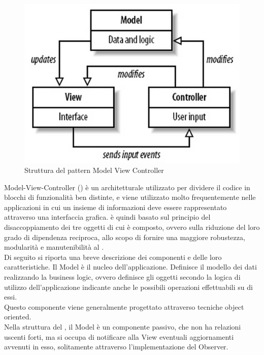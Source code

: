  \label{app:designpattern}
	 \label{app:MVC}
		\begin{figure}[H]\centering
        \includegraphics[scale=0.7]{SpecificaTecnica/Pics/MVC}
        \caption{Struttura del pattern Model View Controller}
		\end{figure}
		Model-View-Controller () è un  architetturale utilizzato per dividere il codice in blocchi di funzionalità ben distinte, e viene utilizzato molto frequentemente nelle applicazioni in cui un insieme di informazioni deve essere rappresentato attraverso una interfaccia grafica.
			 è quindi basato sul principio del disaccoppiamento dei tre oggetti di cui è composto, ovvero sulla riduzione del loro grado di dipendenza reciproca, allo scopo di fornire una maggiore robustezza, modularità e manutenibilità al .\\
			Di seguito si riporta una breve descrizione dei componenti e delle loro caratteristiche. 
				Il Model è il nucleo dell'applicazione. Definisce il modello dei dati realizzando la business logic, ovvero definisce gli oggetti secondo la logica di utilizzo dell'applicazione indicante anche le possibili operazioni effettuabili su di essi.\\
				Questo componente viene generalmente progettato attraverso tecniche object oriented.\\
				Nella struttura del  , il Model è un componente passivo, che non ha relazioni uscenti forti, ma si occupa di notificare alla View eventuali aggiornamenti avvenuti in esso, solitamente attraverso l'implementazione del  Observer.
